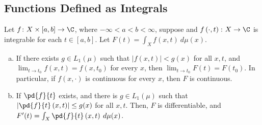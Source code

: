\documentclass[10pt]{mypackage}
\begin{document}
\subsection{Functions Defined as Integrals}%
\begin{theorem}
  Let $f\colon X\times [a,b]\rightarrow \C$, where $-\infty < a < b < \infty$, suppose and $f\left( \cdot,t \right)\colon X\rightarrow \C$ is integrable for each $t\in [a,b]$. Let $F(t) = \int_{X}^{} f(x,t)\:d\mu(x)$.
  \begin{enumerate}[(a)]
    \item If there exists $g\in L_1\left( \mu \right)$ such that $\left\vert f(x,t) \right\vert < g(x)$ for all $x,t$, and $\lim_{t\rightarrow t_0} f\left( x,t \right) = f\left( x,t_0 \right)$ for every $x$, then $\lim_{t\rightarrow t_0}F\left( t \right) = F\left( t_0 \right)$. In particular, if $f\left( x,\cdot \right)$ is continuous for every $x$, then $F$ is continuous.
    \item If $\pd{f}{t}$ exists, and there is $g\in L_1\left( \mu \right)$ such that $\left\vert \pd{f}{t} \left( x,t \right)\right\vert\leq g(x)$ for all $x,t$. Then, $F$ is differentiable, and $F'(t) = \int_{X}^{} \pd{f}{t}\left( x,t \right)\:d\mu(x)$.
  \end{enumerate}
\end{theorem}
\end{document}
